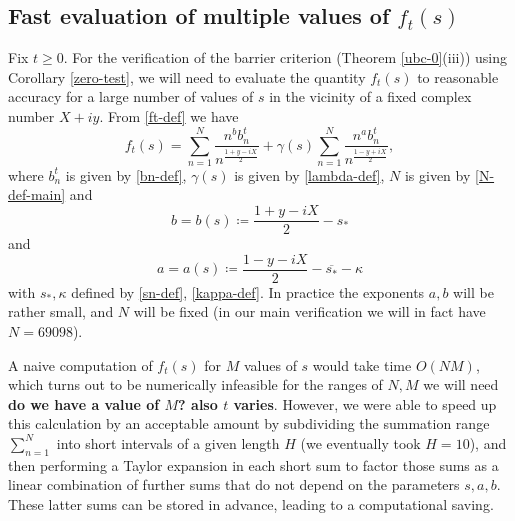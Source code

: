\subsection{Fast evaluation of multiple values of $f_t(s)$}

Fix $t \geq 0$.  For the verification of the barrier criterion (Theorem \ref{ubc-0}(iii)) using Corollary \ref{zero-test}, we will need to evaluate the quantity $f_t(s)$ to reasonable accuracy for a large number of values of $s$ in the vicinity of a fixed complex number $X+iy$.  From \eqref{ft-def} we have
\begin{equation}\label{fts}
f_t(s) = \sum_{n=1}^N \frac{n^b b_n^t}{n^{\frac{1+y-iX}{2}}} + \gamma(s) \sum_{n=1}^N \frac{n^a b_n^t}{n^{\frac{1-y+iX}{2}}},
\end{equation}
where $b_n^t$ is given by \eqref{bn-def}, $\gamma(s)$ is given by \eqref{lambda-def}, $N$ is given by \eqref{N-def-main} and
$$ b = b(s) \coloneqq  \frac{1+y-iX}{2} - s_* $$
and
$$ a = a(s) \coloneqq  \frac{1-y-iX}{2} - \overline{s_*} - \kappa$$
with $s_*, \kappa$ defined by \eqref{sn-def}, \eqref{kappa-def}.  In practice the exponents $a,b$ will be rather small, and $N$ will be fixed (in our main verification we will in fact have $N = 69098$).

A naive computation of $f_t(s)$ for $M$ values of $s$ would take time $O(NM)$, which turns out to be numerically infeasible for the ranges of $N,M$ we will need {\bf do we have a value of $M$?  also $t$ varies}.  However, we were able to speed up this calculation by an acceptable amount by subdividing the summation range $\sum_{n=1}^N$ into short intervals of a given length $H$ (we eventually took $H=10$), and then performing a Taylor expansion in each short sum to factor those sums as a linear combination of further sums that do not depend on the parameters $s,a,b$.  These latter sums can be stored in advance, leading to a computational saving.

